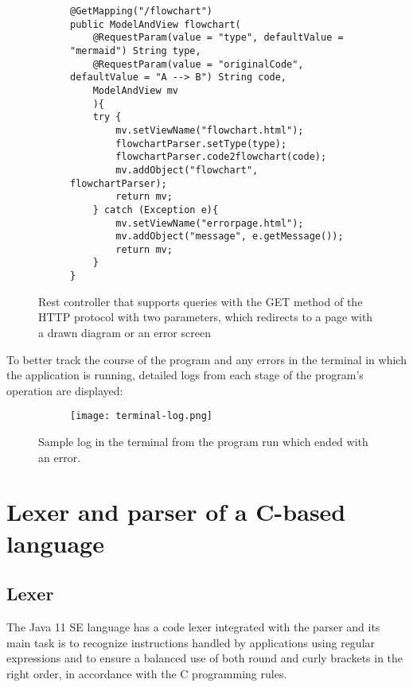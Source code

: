 \begin{figure}[H]
	\begin{subfigure}{\textwidth}
			\begin{verbatim}
@GetMapping("/flowchart")
public ModelAndView flowchart(
    @RequestParam(value = "type", defaultValue = "mermaid") String type,
    @RequestParam(value = "originalCode", defaultValue = "A --> B") String code,
    ModelAndView mv
    ){
    try {
        mv.setViewName("flowchart.html");
        flowchartParser.setType(type);
        flowchartParser.code2flowchart(code);
        mv.addObject("flowchart", flowchartParser);
        return mv;
    } catch (Exception e){
        mv.setViewName("errorpage.html");
        mv.addObject("message", e.getMessage());
        return mv;
    }
}
			\end{verbatim}
	\end{subfigure}\hfill
  	\caption{Rest controller that supports queries with the GET method of the HTTP protocol with two parameters, which redirects to a page with a drawn diagram or an error screen}
\end{figure}

\bigbreak
To better track the course of the program and any errors in the terminal in which the application is running, detailed logs from each stage of the program's operation are displayed:
		
\begin{figure}[H]
  \begin{subfigure}{\textwidth}
  \centering
    \texttt{[image: terminal-log.png]}
  \end{subfigure}\hfill
  \caption{Sample log in the terminal from the program run which ended with an error. }
\end{figure}
	

\section{Lexer and parser of a C-based language}
	\subsection{Lexer} 
  The Java 11 SE language has a code lexer integrated with the parser and its main task is to recognize instructions handled by applications using regular expressions and to ensure a balanced use of both round and curly brackets in the right order, in accordance with the C programming rules. 


